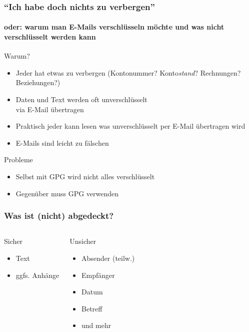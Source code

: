 \documentclass{beamer}
\begin{document}
\begin{frame}
  \frametitle{``Ich habe doch nichts zu verbergen''}
  \framesubtitle{oder: warum man E-Mails verschlüsseln möchte und was nicht verschlüsselt werden kann}

  \begin{block}{Warum?}
    \begin{itemize}
    \item Jeder hat etwas zu verbergen (Kontonummer? Konto\emph{stand}?
      Rechnungen? Beziehungen?)
    \item Daten und Text werden oft unverschlüsselt\\via E-Mail übertragen
    \small
    \item Praktisch jeder kann lesen was unverschlüsselt per E-Mail übertragen
      wird
    \item E-Mails sind leicht zu fälschen
    \end{itemize}
  \end{block}
  \pause
  \begin{block}{Probleme}
    \begin{itemize}
    \item Selbst mit GPG wird nicht alles verschlüsselt
    \item Gegenüber muss GPG verwenden
    \end{itemize}
  \end{block}
\end{frame}

\begin{frame}
  \frametitle{Was ist (nicht) abgedeckt?}
  \begin{columns}
    \begin{block}{Sicher}
      \begin{itemize}
      \item Text
      \item ggfs. Anhänge
      \end{itemize}
    \end{block}
    \begin{block}{Unsicher}
      \begin{itemize}
      \item Absender (teilw.)
      \item Empfänger
      \item Datum
      \item Betreff
      \item und mehr
      \end{itemize}
    \end{block}
  \end{columns}
\end{frame}
\end{document}
